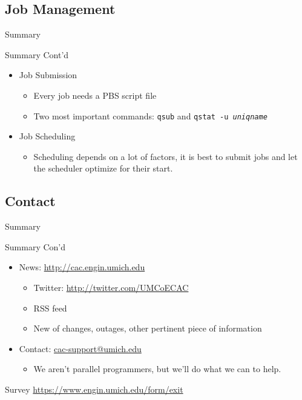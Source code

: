 \documentclass[handout]{beamer}
\begin{document}
\subsection{Job Management}
\begin{frame}{Summary}
 \begin{block}{Summary Cont'd}
 \begin{itemize}
   \item Job Submission
     \begin{itemize}
     \item Every job needs a PBS script file
     \item Two most important commands: \texttt{qsub} and \texttt{qstat -u \textit{uniqname}}
     \end{itemize}
   \item Job Scheduling
     \begin{itemize}
     \item Scheduling depends on a lot of factors, it is best to submit jobs and let the
scheduler optimize for their start.
     \end{itemize}
 \end{itemize}
 \end{block}
\end{frame}
\subsection{Contact}
\begin{frame}{Summary}
 \begin{block}{Summary Con'd}
 \begin{itemize}
 \item News: \url{http://cac.engin.umich.edu}
   \begin{itemize}
    \item Twitter: \url{http://twitter.com/UMCoECAC}
    \item RSS feed
    \item New of changes, outages, other pertinent piece of information
   \end{itemize}
  \item Contact: \url{cac-support@umich.edu}
   \begin{itemize}
    \item We aren't parallel programmers, but we'll do what we can to help.
   \end{itemize}
 \end{itemize}
 \end{block}
 \begin{block}{Survey}
    \url{https://www.engin.umich.edu/form/exit}
 \end{block}
\end{frame}
\end{document}
